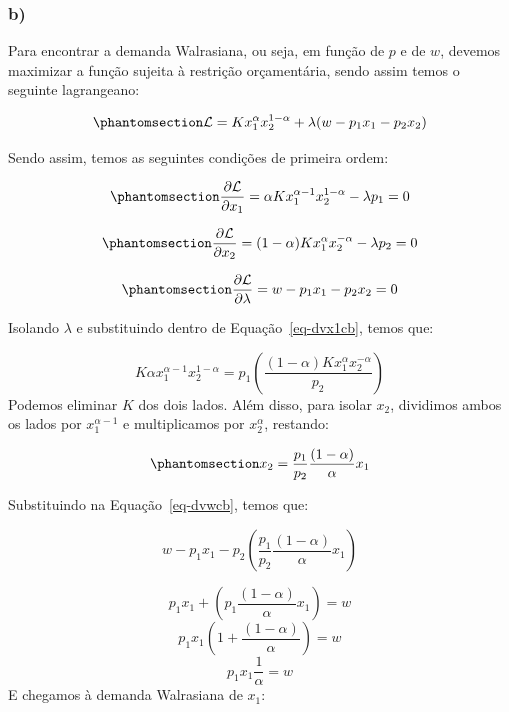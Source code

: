 \documentclass[
  letterpaper,
  DIV=11,
  numbers=noendperiod]{scrartcl}
\newcommand{\Lagr}{\mathcal{L}}
\begin{document}
\subsubsection{b)}\label{b-2}

Para encontrar a demanda Walrasiana, ou seja, em função de \(p\) e de
\(w\), devemos maximizar a função sujeita à restrição orçamentária,
sendo assim temos o seguinte lagrangeano:

\begin{equation}\phantomsection\label{eq-lagrcd}{
\mathcal{L} = Kx_1^\alpha x_2^{1-\alpha} + \lambda(w - p_1x_1 - p_2x_2)
}\end{equation}

Sendo assim, temos as seguintes condições de primeira ordem:

\begin{equation}\phantomsection\label{eq-dvx1cb}{
\pdv{\Lagr}{x_1} = \alpha Kx_1^{\alpha-1}x_2^{1-\alpha} - \lambda p_1 = 0
}\end{equation}

\begin{equation}\phantomsection\label{eq-dvx2cb}{
\pdv{\Lagr}{x_2} = (1-\alpha)Kx_1^\alpha x_2^{-\alpha} - \lambda p_2 = 0
}\end{equation}

\begin{equation}\phantomsection\label{eq-dvwcb}{
\pdv{\Lagr}{\lambda} = w - p_1x_1 - p_2x_2 = 0
}\end{equation}

Isolando \(\lambda\) e substituindo dentro de Equação~\ref{eq-dvx1cb},
temos que:

\[
K\alpha x_1^{\alpha -1}x_2^{1-\alpha} = p_1 \left(\frac{(1-\alpha)Kx_1^\alpha x_2^{-\alpha}}{p_2}  \right)
\] Podemos eliminar \(K\) dos dois lados. Além disso, para isolar
\(x_2\), dividimos ambos os lados por \(x_1^{\alpha -1}\) e
multiplicamos por \(x_2^{\alpha}\), restando:

\begin{equation}\phantomsection\label{eq-dmx2}{
x_2 = \frac{p_1}{p_2}\frac{(1-\alpha)}{\alpha}x_1
}\end{equation}

Substituindo na Equação~\ref{eq-dvwcb}, temos que:

\[
w - p_1x_1 - p_2\left( \frac{p_1}{p_2}\frac{(1-\alpha)}{\alpha}x_1\right) 
\]

\[
p_1x_1 + \left( p_1\frac{(1-\alpha)}{\alpha}x_1\right)=   w
\] \[
p_1x_1 \left(1 + \frac{(1-\alpha)}{\alpha}  \right) = w
\] \[
p_1x_1 \frac{1}{\alpha}   = w
\] E chegamos à demanda Walrasiana de \(x_1\):
\end{document}
